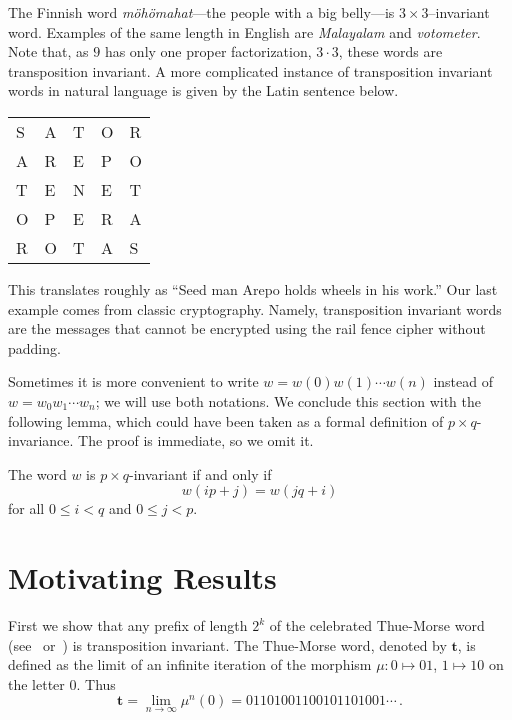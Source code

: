 \documentclass{elsart}
\newcommand{\thue}{\mathbf{t}}
\begin{document}
The Finnish word {\em m\"oh\"omahat}---the people with a
big belly---is $3\times 3$--invariant word. Examples of the same length in English are {\em Malayalam}
and {\em votometer}. Note that, as $9$ has only one proper factorization, $3\cdot 3$, these words are transposition invariant.
A more complicated instance of transposition invariant words in natural language is given by the Latin sentence below.
\begin{center}
\begin{tabular}[b]{lllll}
S & A & T & O & R \\
A & R & E & P & O \\
T & E & N & E & T \\
O & P & E & R & A \\
R & O & T & A & S
\end{tabular}
\end{center}
This translates roughly as ``Seed man
Arepo holds wheels in his work.'' Our last example comes from classic cryptography. Namely, transposition invariant words are the messages that cannot be encrypted  using the rail fence cipher without padding.

Sometimes it is more convenient to write $w=w(0)w(1)\cdots w(n)$ instead of
$w=w_0 w_1 \cdots w_n$; we will use both notations.
We conclude this section with the following lemma, which could have been taken as a formal definition of $p\times q$-invariance. The proof is immediate, so we omit it.

\begin{lem}\label{def}
The word $w$ is $p\times q$-invariant if and only if
\begin{equation}\label{ehto}
w(ip+j)=w(jq+i)
\end{equation}
for all $0\leq i < q$ and $ 0 \leq j < p$.
\end{lem}


\section{Motivating Results}

First we show that any prefix of length $2^k$ of the celebrated Thue-Morse word (see~\cite{AS} or~\cite{Lot}) is transposition invariant. The Thue-Morse word, denoted by $\thue$, is defined as the limit of an infinite iteration of the morphism $\mu: 0 \mapsto 01$, $1\mapsto 10$
on the letter 0. Thus
$$
\thue = \lim_{n\rightarrow \infty}\mu^n(0)= 01101001100101101001\cdots\,.
$$
\end{document}
